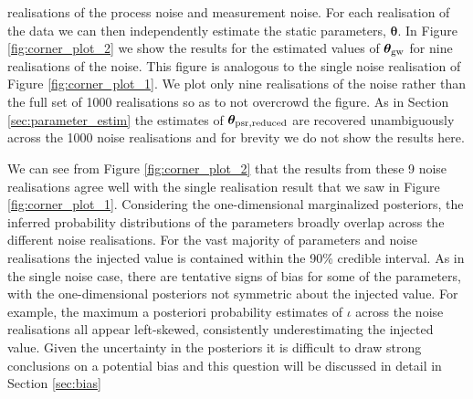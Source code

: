 \documentclass[fleqn,usenatbib,useAMS]{mnras}
\providecommand{\DIFdelend}{} %
\DeclareRobustCommand{\DIFdelend}{\DIFOaddend \let\includegraphics\DIFOincludegraphics} %
\begin{document}
\addtocounter{footnote}{-1}%
\DIFdelend realisations of the process noise and measurement noise. For each realisation of the data we can then independently estimate the static parameters, $\boldsymbol{\theta}$. In Figure \ref{fig:corner_plot_2} we show the results for the  estimated values of $\boldsymbol{\theta}_{\rm gw}$ for nine realisations of the noise. This figure is analogous to the single noise realisation of Figure \ref{fig:corner_plot_1}. We plot only nine realisations of the noise rather than the full set of 1000 realisations so as to not overcrowd the figure. As in Section \ref{sec:parameter_estim} the estimates of $\boldsymbol{\theta}_{\rm psr, reduced}$ are recovered unambiguously across the 1000 noise realisations and for brevity we do not show the results here. \newline 


We can see from Figure \ref{fig:corner_plot_2} that the results from these 9 noise realisations agree well with the single realisation result that we saw in  Figure \ref{fig:corner_plot_1}. Considering the one-dimensional marginalized posteriors, the inferred probability distributions of the parameters broadly overlap across the different noise realisations. For the vast majority of parameters and noise realisations the injected value is contained within the 90\% credible interval. As in the single noise case, there are tentative signs of bias for some of the parameters, with the one-dimensional posteriors not symmetric about the injected value. For example, the maximum a posteriori probability estimates of $\iota$ across the noise realisations all appear left-skewed, consistently underestimating the injected value. Given the uncertainty in the posteriors it is difficult to draw strong conclusions on a potential bias and this question will be discussed in detail in Section \ref{sec:bias} \newline 
\end{document}
